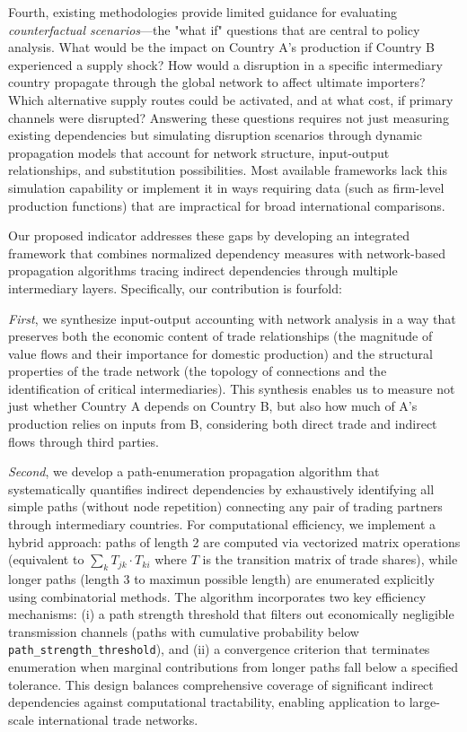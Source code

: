 \documentclass[final,1p,times,authoryear]{elsarticle}
\begin{document}
Fourth, existing methodologies provide limited guidance for evaluating \textit{counterfactual scenarios}—the "what if" questions that are central to policy analysis. What would be the impact on Country A's production if Country B experienced a supply shock? How would a disruption in a specific intermediary country propagate through the global network to affect ultimate importers? Which alternative supply routes could be activated, and at what cost, if primary channels were disrupted? Answering these questions requires not just measuring existing dependencies but simulating disruption scenarios through dynamic propagation models that account for network structure, input-output relationships, and substitution possibilities. Most available frameworks lack this simulation capability or implement it in ways requiring data (such as firm-level production functions) that are impractical for broad international comparisons.

Our proposed indicator addresses these gaps by developing an integrated framework that combines normalized dependency measures with network-based propagation algorithms tracing indirect dependencies through multiple intermediary layers. Specifically, our contribution is fourfold:

\textit{First}, we synthesize input-output accounting with network analysis in a way that preserves both the economic content of trade relationships (the magnitude of value flows and their importance for domestic production) and the structural properties of the trade network (the topology of connections and the identification of critical intermediaries). This synthesis enables us to measure not just whether Country A depends on Country B, but also how much of A's production relies on inputs from B, considering both direct trade and indirect flows through third parties.

\textit{Second}, we develop a path-enumeration propagation algorithm that systematically quantifies indirect dependencies by exhaustively identifying all simple paths (without node repetition) connecting any pair of trading partners through intermediary countries. For computational efficiency, we implement a hybrid approach: paths of length 2 are computed via vectorized matrix operations (equivalent to $\sum_k T_{jk} \cdot T_{ki}$ where $T$ is the transition matrix of trade shares), while longer paths (length 3 to maximun possible length) are enumerated explicitly using combinatorial methods. The algorithm incorporates two key efficiency mechanisms: (i) a path strength threshold that filters out economically negligible transmission channels (paths with cumulative probability below \texttt{path\_strength\_threshold}), and (ii) a convergence criterion that terminates enumeration when marginal contributions from longer paths fall below a specified tolerance. This design balances comprehensive coverage of significant indirect dependencies against computational tractability, enabling application to large-scale international trade networks.
\end{document}
